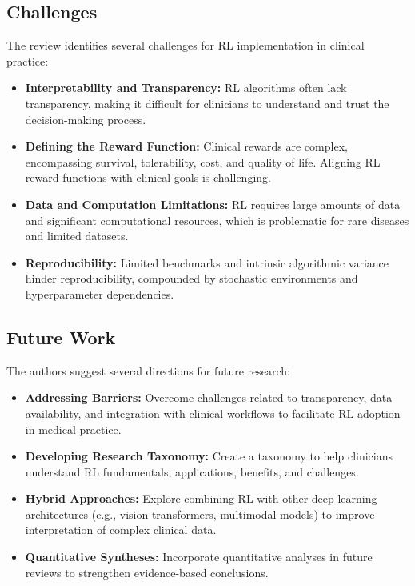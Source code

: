 \subsection*{Challenges}
The review identifies several challenges for RL implementation in clinical practice:
\begin{itemize}
    \item \textbf{Interpretability and Transparency:} RL algorithms often lack transparency, making it difficult for clinicians to understand and trust the decision-making process.
    \item \textbf{Defining the Reward Function:} Clinical rewards are complex, encompassing survival, tolerability, cost, and quality of life. Aligning RL reward functions with clinical goals is challenging.
    \item \textbf{Data and Computation Limitations:} RL requires large amounts of data and significant computational resources, which is problematic for rare diseases and limited datasets.
    \item \textbf{Reproducibility:} Limited benchmarks and intrinsic algorithmic variance hinder reproducibility, compounded by stochastic environments and hyperparameter dependencies.
\end{itemize}

\subsection*{Future Work}
The authors suggest several directions for future research:
\begin{itemize}
    \item \textbf{Addressing Barriers:} Overcome challenges related to transparency, data availability, and integration with clinical workflows to facilitate RL adoption in medical practice.
    \item \textbf{Developing Research Taxonomy:} Create a taxonomy to help clinicians understand RL fundamentals, applications, benefits, and challenges.
    \item \textbf{Hybrid Approaches:} Explore combining RL with other deep learning architectures (e.g., vision transformers, multimodal models) to improve interpretation of complex clinical data.
    \item \textbf{Quantitative Syntheses:} Incorporate quantitative analyses in future reviews to strengthen evidence-based conclusions.
\end{itemize}

